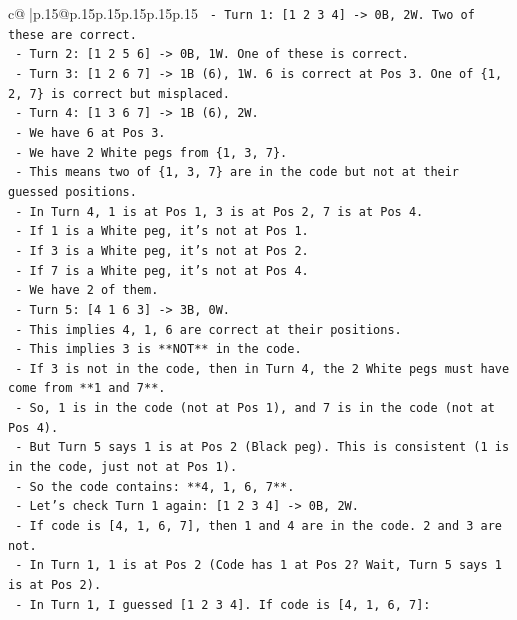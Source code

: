 \documentclass{article}
\begin{document}
{\begin{supertabular}{c@{$\;$}|p{.15\linewidth}@{}p{.15\linewidth}p{.15\linewidth}p{.15\linewidth}p{.15\linewidth}p{.15\linewidth}}
{{{\texttt{  {-} Turn 1: {[}1 2 3 4{]} {-}> 0B, 2W. Two of these are correct.} \\
\texttt{  {-} Turn 2: {[}1 2 5 6{]} {-}> 0B, 1W. One of these is correct.} \\
\texttt{  {-} Turn 3: {[}1 2 6 7{]} {-}> 1B (6), 1W. 6 is correct at Pos 3. One of \{1, 2, 7\} is correct but misplaced.} \\
\texttt{  {-} Turn 4: {[}1 3 6 7{]} {-}> 1B (6), 2W.} \\
\texttt{    {-} We have 6 at Pos 3.} \\
\texttt{    {-} We have 2 White pegs from \{1, 3, 7\}.} \\
\texttt{    {-} This means two of \{1, 3, 7\} are in the code but not at their guessed positions.} \\
\texttt{    {-} In Turn 4, 1 is at Pos 1, 3 is at Pos 2, 7 is at Pos 4.} \\
\texttt{    {-} If 1 is a White peg, it's not at Pos 1.} \\
\texttt{    {-} If 3 is a White peg, it's not at Pos 2.} \\
\texttt{    {-} If 7 is a White peg, it's not at Pos 4.} \\
\texttt{    {-} We have 2 of them.} \\
\texttt{  {-} Turn 5: {[}4 1 6 3{]} {-}> 3B, 0W.} \\
\texttt{    {-} This implies 4, 1, 6 are correct at their positions.} \\
\texttt{    {-} This implies 3 is **NOT** in the code.} \\
\texttt{    {-} If 3 is not in the code, then in Turn 4, the 2 White pegs must have come from **1 and 7**.} \\
\texttt{    {-} So, 1 is in the code (not at Pos 1), and 7 is in the code (not at Pos 4).} \\
\texttt{    {-} But Turn 5 says 1 is at Pos 2 (Black peg). This is consistent (1 is in the code, just not at Pos 1).} \\
\texttt{    {-} So the code contains: **4, 1, 6, 7**.} \\
\texttt{    {-} Let's check Turn 1 again: {[}1 2 3 4{]} {-}> 0B, 2W.} \\
\texttt{      {-} If code is {[}4, 1, 6, 7{]}, then 1 and 4 are in the code. 2 and 3 are not.} \\
\texttt{      {-} In Turn 1, 1 is at Pos 2 (Code has 1 at Pos 2? Wait, Turn 5 says 1 is at Pos 2).} \\
\texttt{      {-} In Turn 1, I guessed {[}1 2 3 4{]}. If code is {[}4, 1, 6, 7{]}:} \\
}}}
\end{supertabular}}
\end{document}
